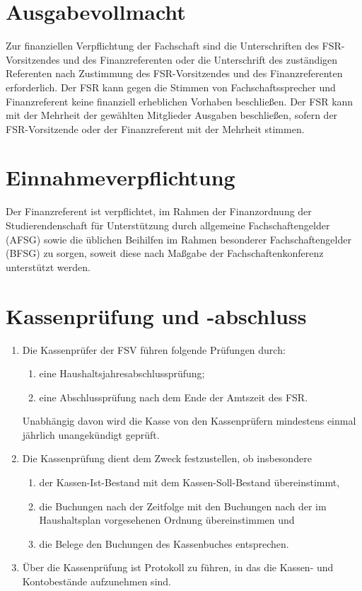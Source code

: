 \documentclass{article}
\begin{document}
\section{Ausgabevollmacht}
Zur finanziellen Verpflichtung der Fachschaft sind die Unterschriften des FSR-Vorsitzendes und des Finanzreferenten oder die Unterschrift des zuständigen Referenten nach Zustimmung des FSR-Vorsitzendes und des Finanzreferenten erforderlich. Der FSR kann gegen die Stimmen von Fachschaftssprecher und Finanzreferent keine finanziell erheblichen Vorhaben beschließen. Der FSR kann mit der Mehrheit der gewählten Mitglieder Ausgaben beschließen, sofern der FSR-Vorsitzende oder der Finanzreferent mit der Mehrheit stimmen.

\section{Einnahmeverpflichtung}
Der Finanzreferent ist verpflichtet, im Rahmen der Finanzordnung der Studierendenschaft für Unterstützung durch allgemeine Fachschaftengelder (AFSG) sowie die üblichen Beihilfen im Rahmen besonderer Fachschaftengelder (BFSG) zu sorgen, soweit diese nach Maßgabe der Fachschaftenkonferenz unterstützt werden.

\section{Kassenprüfung und -abschluss}
\begin{enumerate}[(1)]
    \item Die Kassenprüfer der FSV führen folgende Prüfungen durch:
    \begin{enumerate}[1.]
        \item eine Haushaltsjahresabschlussprüfung;
        \item eine Abschlussprüfung nach dem Ende der Amtszeit des FSR.
    \end{enumerate}
    Unabhängig davon wird die Kasse von den Kassenprüfern mindestens einmal jährlich unangekündigt geprüft. 
    \item Die Kassenprüfung dient dem Zweck festzustellen, ob insbesondere
    \begin{enumerate}[1.]
        \item der Kassen-Ist-Bestand mit dem Kassen-Soll-Bestand übereinstimmt,
        \item die Buchungen nach der Zeitfolge mit den Buchungen nach der im Haushaltsplan vorgesehenen Ordnung übereinstimmen und
        \item die Belege den Buchungen des Kassenbuches entsprechen.
    \end{enumerate}
    \item Über die Kassenprüfung ist Protokoll zu führen, in das die Kassen- und Kontobestände aufzunehmen sind.
\end{enumerate}
\end{document}
